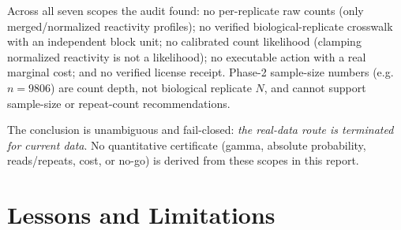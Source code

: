 \documentclass[11pt]{article}
\begin{document}
\begin{table}[H]\centering
\caption{Seven-scope data-qualification matrix (full per-scope detail in the ancillary CSV). All scopes fail closed.}\label{tab:qual}
\end{table}

Across all seven scopes the audit found: no per-replicate raw counts (only merged/normalized reactivity profiles); no verified biological-replicate crosswalk with an independent block unit; no calibrated count likelihood (clamping normalized reactivity is not a likelihood); no executable action with a real marginal cost; and no verified license receipt. Phase-2 sample-size numbers (e.g.\ $n=9806$) are count depth, not biological replicate $N$, and cannot support sample-size or repeat-count recommendations.

The conclusion is unambiguous and fail-closed: \emph{the real-data route is terminated for current data}. No quantitative certificate (gamma, absolute probability, reads/repeats, cost, or no-go) is derived from these scopes in this report.

\section{Lessons and Limitations}\label{sec:lessons}
\end{document}
